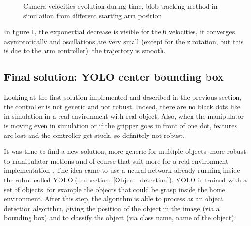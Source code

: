 \begin{figure}[!ht]
     \centering
     \label{<figure_simulation_1>]}
     \label{<figure_simulation_2>]}
     \caption{Camera velocities evolution during time, blob tracking method in simulation from different starting arm position}
     \label{pict:plot_simulation_2}
\end{figure}
In figure \ref{pict:plot_simulation_2}, the exponential decrease is visible for the 6 velocities, it converges asymptotically and oscillations are very small (except for the z rotation, but this is due to the arm controller), the trajectory is smooth.

\subsection{Final solution: YOLO center bounding box}

Looking at the first solution implemented and described in the previous section, the controller is not generic and not robust. Indeed, there are no black dots like in simulation in a real environment with real object. Also, when the manipulator is moving even in simulation or if the gripper goes in front of one dot, features are lost and the controller get stuck, so  definitely not robust. 

It was time to find a new solution, more generic for multiple objects, more robust to manipulator motions and of course that suit more for a real environment implementation . The idea came to use a neural network already running inside the robot called YOLO (see section: \ref{Object_detection}). YOLO is trained with a set of objects, for example the objects that could be grasp inside the home environment. After this step, the algorithm is able to process as an object detection algorithm, giving the position of the object in the image (via a bounding box) and to classify the object (via class name, name of the object). 

